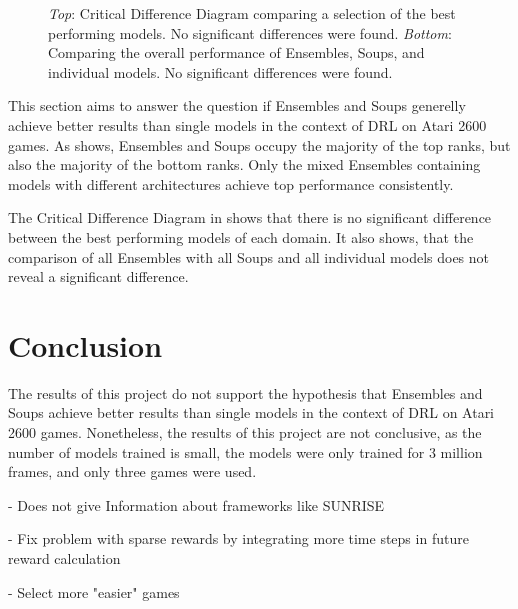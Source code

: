 \begin{figure}[ht!]
    \centering

    \caption{\textit{Top}: Critical Difference Diagram comparing a selection of the best performing models. No significant differences were found. \textit{Bottom}: Comparing the overall performance of Ensembles, Soups, and individual models. No significant differences were found.}
    \label{fig:cdd}
\end{figure}

This section aims to answer the question if Ensembles and Soups generelly achieve better results than single models in the context of DRL on Atari 2600 games. As  shows, Ensembles and Soups occupy the majority of the top ranks, but also the majority of the bottom ranks. Only the mixed Ensembles containing models with different architectures achieve top performance consistently. 

The Critical Difference Diagram in  shows that there is no significant difference between the best performing models of each domain. It also shows, that the comparison of all Ensembles with all Soups and all individual models does not reveal a significant difference.


\FloatBarrier
\chapter{Conclusion}

The results of this project do not support the hypothesis that Ensembles and Soups achieve better results than single models in the context of DRL on Atari 2600 games. Nonetheless, the results of this project are not conclusive, as the number of models trained is small, the models were only trained for 3 million frames, and only three games were used. 

- Does not give Information about frameworks like SUNRISE

- Fix problem with sparse rewards by integrating more time steps in future reward calculation


- Select more "easier" games
